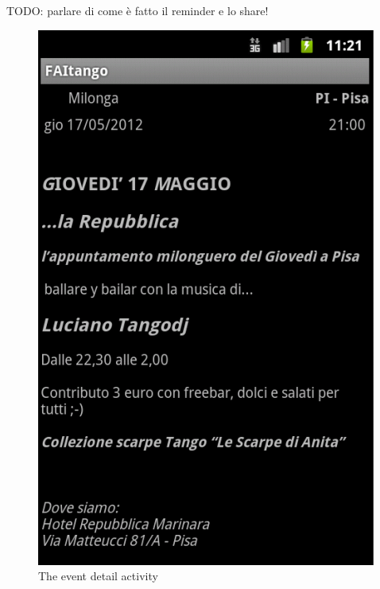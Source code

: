 \documentclass[12pt, twoside]{article}
\begin{document}
TODO: parlare di come è fatto il reminder e lo share!

\begin{figure}[h]
\begin{center}
\includegraphics[scale=0.60]{fig/event-detail-up.png}
\end{center}
\caption{The event detail activity}
\label{fig:eventdetailup}
\end{figure}
\end{document}
